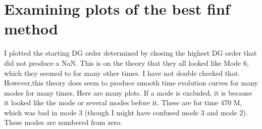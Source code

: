 \documentclass{article}
\begin{document}
\section{Examining plots of the best finf method}


I plotted the starting DG order determined by chosing the highest DG order that did not produce a NaN. This is on the theory that they all looked like Mode 6, which they seemed to for many other times. I have not double checked that. However,this theory does seem to produce smooth time evolution curves for many modes for many times. Here are many plots. If a mode is excluded, it is because it looked like the mode or several modes before it. These are for time 470 M, which was bad in mode 3 (though I might have confused mode 3 and mode 2). These modes are numbered from zero.
\end{document}
